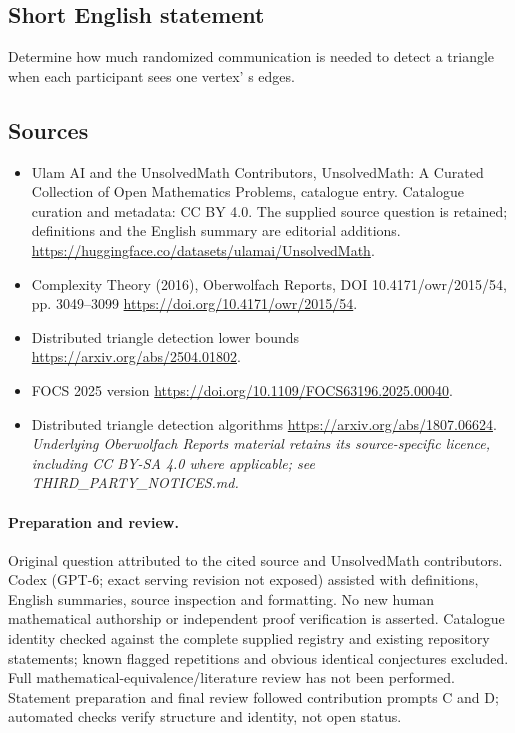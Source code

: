\documentclass[11pt]{article}
\begin{document}
\subsection{Short English statement}
Determine how much randomized communication is needed to detect a triangle when each participant sees one vertex' s edges.
\subsection{Sources}
\begin{itemize}
\item[\hypertarget{source:statement:1}{S1}] Ulam AI and the UnsolvedMath Contributors, UnsolvedMath: A Curated Collection of Open Mathematics Problems, catalogue entry. Catalogue curation and metadata: CC BY 4.0. The supplied source question is retained; definitions and the English summary are editorial additions.
\url{https://huggingface.co/datasets/ulamai/UnsolvedMath}.
\item[\hypertarget{source:statement:2}{S2}] Complexity Theory (2016), Oberwolfach Reports, DOI 10.4171/owr/2015/54, pp. 3049--3099
\url{https://doi.org/10.4171/owr/2015/54}.
\item[\hypertarget{source:statement:3}{S3}] Distributed triangle detection lower bounds
\url{https://arxiv.org/abs/2504.01802}.
\item[\hypertarget{source:statement:4}{S4}] FOCS 2025 version
\url{https://doi.org/10.1109/FOCS63196.2025.00040}.
\item[\hypertarget{source:statement:5}{S5}] Distributed triangle detection algorithms
\url{https://arxiv.org/abs/1807.06624}.
\textit{Underlying Oberwolfach Reports material retains its source-specific licence, including CC BY-SA 4.0 where applicable; see THIRD\_PARTY\_NOTICES.md.}
\end{itemize}
\paragraph{Preparation and review.}
Original question attributed to the cited source and UnsolvedMath contributors. Codex (GPT-6; exact serving revision not exposed) assisted with definitions, English summaries, source inspection and formatting. No new human mathematical authorship or independent proof verification is asserted. Catalogue identity checked against the complete supplied registry and existing repository statements; known flagged repetitions and obvious identical conjectures excluded. Full mathematical-equivalence/literature review has not been performed. Statement preparation and final review followed contribution prompts C and D; automated checks verify structure and identity, not open status.
\label{end:statement}
\end{document}

